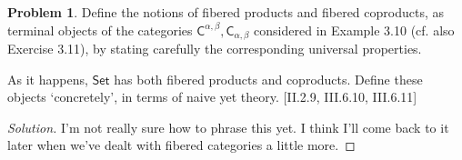 \documentclass[fontsize=14pt]{scrartcl}
\theoremstyle{definition}
\newtheorem{problem-internal}{Problem}[subsection]
\newenvironment{problem}{
  \medskip
  \begin{problem-internal}
}{
  \end{problem-internal}
}
\newenvironment{solution}{
  \begin{proof}[Solution]
  \vspace{-8px}
  \setlength{\parskip}{4px}
  \setlength{\parindent}{0px}
}{
  \end{proof}
}
\begin{document}
\begin{problem}
\def \C {\mathsf{C}}
\def \Set {\mathsf{Set}}
Define the notions of fibered products and fibered coproducts, as terminal
objects of the categories $\C^{\alpha,\beta}, \C_{\alpha,\beta}$ considered in
Example 3.10 (cf. also Exercise 3.11), by stating carefully the corresponding
universal properties.

As it happens, $\Set$ has both fibered products and coproducts. Define these
objects `concretely', in terms of naive yet theory. [II.2.9, III.6.10, III.6.11]
\end{problem}
\begin{solution}
I'm not really sure how to phrase this yet. I think I'll come back to it later
when we've dealt with fibered categories a little more.
\end{solution}
\end{document}
